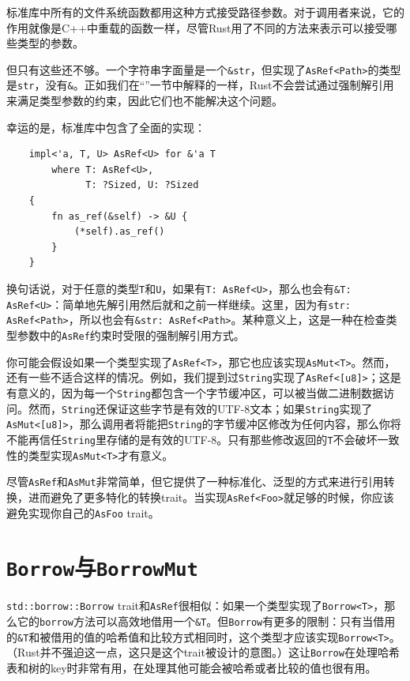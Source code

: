 标准库中所有的文件系统函数都用这种方式接受路径参数。对于调用者来说，它的作用就像是C++中重载的函数一样，尽管Rust用了不同的方法来表示可以接受哪些类型的参数。

但只有这些还不够。一个字符串字面量是一个\texttt{\&str}，但实现了\texttt{AsRef<Path>}的类型是\texttt{str}，没有\texttt{\&}。正如我们在“”一节中解释的一样，Rust不会尝试通过强制解引用来满足类型参数的约束，因此它们也不能解决这个问题。

幸运的是，标准库中包含了全面的实现：
\begin{verbatim}
    impl<'a, T, U> AsRef<U> for &'a T
        where T: AsRef<U>,
              T: ?Sized, U: ?Sized
    {
        fn as_ref(&self) -> &U {
            (*self).as_ref()
        }
    }
\end{verbatim}

换句话说，对于任意的类型\texttt{T}和\texttt{U}，如果有\texttt{T: AsRef<U>}，那么也会有\texttt{\&T: AsRef<U>}：简单地先解引用然后就和之前一样继续。这里，因为有\texttt{str: AsRef<Path>}，所以也会有\texttt{\&str: AsRef<Path>}。某种意义上，这是一种在检查类型参数中的\texttt{AsRef}约束时受限的强制解引用方式。

你可能会假设如果一个类型实现了\texttt{AsRef<T>}，那它也应该实现\texttt{AsMut<T>}。然而，还有一些不适合这样的情况。例如，我们提到过\texttt{String}实现了\texttt{AsRef<[u8]>}；这是有意义的，因为每一个\texttt{String}都包含一个字节缓冲区，可以被当做二进制数据访问。然而，\texttt{String}还保证这些字节是有效的UTF-8文本；如果\texttt{String}实现了\texttt{AsMut<[u8]>}，那么调用者将能把\texttt{String}的字节缓冲区修改为任何内容，那么你将不能再信任\texttt{String}里存储的是有效的UTF-8。只有那些修改返回的\texttt{T}不会破坏一致性的类型实现\texttt{AsMut<T>}才有意义。

尽管\texttt{AsRef}和\texttt{AsMut}非常简单，但它提供了一种标准化、泛型的方式来进行引用转换，进而避免了更多特化的转换trait。当实现\texttt{AsRef<Foo>}就足够的时候，你应该避免实现你自己的\texttt{AsFoo} trait。


\section{\texttt{Borrow}与\texttt{BorrowMut}}\label{borrow}

\texttt{std::borrow::Borrow} trait和\texttt{AsRef}很相似：如果一个类型实现了\texttt{Borrow<T>}，那么它的\texttt{borrow}方法可以高效地借用一个\texttt{\&T}。但\texttt{Borrow}有更多的限制：只有当借用的\texttt{\&T}和被借用的值的哈希值和比较方式相同时，这个类型才应该实现\texttt{Borrow<T>}。（Rust并不强迫这一点，这只是这个trait被设计的意图。）这让\texttt{Borrow}在处理哈希表和树的key时非常有用，在处理其他可能会被哈希或者比较的值也很有用。

